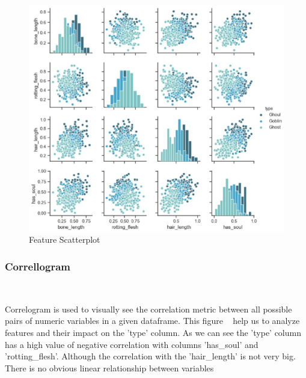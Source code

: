 \begin{figure}[htbp]
	\centering
	\includegraphics[scale=0.4]{figures/pairplot.eps}
	\caption{Feature Scatterplot}\label{fig:feature_scatterplot}
\end{figure}

\subsubsection{Correllogram}
\

Correlogram is used to 
visually see the correlation metric 
between all possible pairs of numeric variables 
in a given dataframe. 
This figure ~ 
help us to analyze features 
and their impact on the 'type' column. 
As we can see the 'type' column 
has a high value of negative correlation 
with columns 'has_soul' and 'rotting_flesh'. 
Although the correlation 
with the 'hair_length' is not very big.
There is no obvious linear relationship 
between variables

